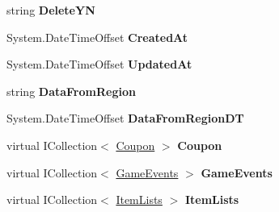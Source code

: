 \begin{DoxyCompactItemize}
\item 
string {\bfseries Delete\+YN}\hypertarget{a00012_aead47648e719a3dcf1af9fe4c0f23254}{}\label{a00012_aead47648e719a3dcf1af9fe4c0f23254}

\item 
System.\+Date\+Time\+Offset {\bfseries Created\+At}\hypertarget{a00012_a88315f76253d6d742ace469f73aedbec}{}\label{a00012_a88315f76253d6d742ace469f73aedbec}

\item 
System.\+Date\+Time\+Offset {\bfseries Updated\+At}\hypertarget{a00012_af8e24342879b78e53c4b1504cbff7fff}{}\label{a00012_af8e24342879b78e53c4b1504cbff7fff}

\item 
string {\bfseries Data\+From\+Region}\hypertarget{a00012_a07a204da0997ef2f0e6e601e125c9bb5}{}\label{a00012_a07a204da0997ef2f0e6e601e125c9bb5}

\item 
System.\+Date\+Time\+Offset {\bfseries Data\+From\+Region\+DT}\hypertarget{a00012_a61fc510ab276c9be1a83dd0e8e626814}{}\label{a00012_a61fc510ab276c9be1a83dd0e8e626814}

\item 
virtual I\+Collection$<$ \hyperlink{a00068}{Coupon} $>$ {\bfseries Coupon}\hypertarget{a00012_ae1d8e0f9d63ef14f48eda51eace1145b}{}\label{a00012_ae1d8e0f9d63ef14f48eda51eace1145b}

\item 
virtual I\+Collection$<$ \hyperlink{a00083}{Game\+Events} $>$ {\bfseries Game\+Events}\hypertarget{a00012_a9c407e18afb322b0c7896dbd47e0f48a}{}\label{a00012_a9c407e18afb322b0c7896dbd47e0f48a}

\item 
virtual I\+Collection$<$ \hyperlink{a00127}{Item\+Lists} $>$ {\bfseries Item\+Lists}\hypertarget{a00012_a381363569bddc3b70eb317ced069f2b6}{}\label{a00012_a381363569bddc3b70eb317ced069f2b6}


\end{DoxyCompactItemize}

